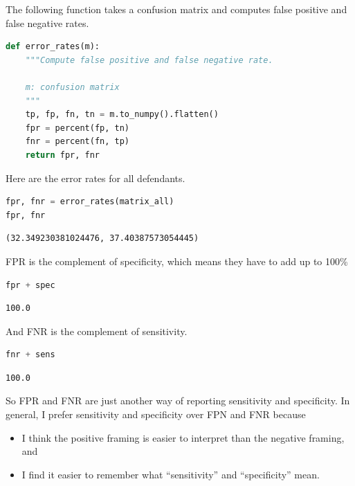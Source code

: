 The following function takes a confusion matrix and computes false
positive and false negative rates.

\begin{lstlisting}[language=Python,style=source]
def error_rates(m):
    """Compute false positive and false negative rate.
    
    m: confusion matrix
    """
    tp, fp, fn, tn = m.to_numpy().flatten()
    fpr = percent(fp, tn)
    fnr = percent(fn, tp)
    return fpr, fnr
\end{lstlisting}

Here are the error rates for all defendants.

\begin{lstlisting}[language=Python,style=source]
fpr, fnr = error_rates(matrix_all)
fpr, fnr
\end{lstlisting}

\begin{lstlisting}[style=output]
(32.349230381024476, 37.40387573054445)
\end{lstlisting}

FPR is the complement of specificity, which means they have to add up to
100\%

\begin{lstlisting}[language=Python,style=source]
fpr + spec
\end{lstlisting}

\begin{lstlisting}[style=output]
100.0
\end{lstlisting}

And FNR is the complement of sensitivity.

\begin{lstlisting}[language=Python,style=source]
fnr + sens
\end{lstlisting}

\begin{lstlisting}[style=output]
100.0
\end{lstlisting}

So FPR and FNR are just another way of reporting sensitivity and
specificity. In general, I prefer sensitivity and specificity over FPN
and FNR because

\begin{itemize}
\item
  I think the positive framing is easier to interpret than the negative
  framing, and
\item
  I find it easier to remember what ``sensitivity'' and ``specificity''
  mean.
\end{itemize}

